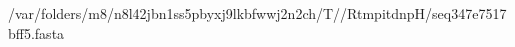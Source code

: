 \documentclass[10pt]{article}
\begin{document}
\begin{texshade}{/var/folders/m8/n8l42jbn1ss5pbyxj9lkbfwwj2n2ch/T//RtmpitdnpH/seq347e7517bff5.fasta}
\hidelogoscale
{}
\hidenumbering
\showlegend
\end{texshade}
\end{document}
